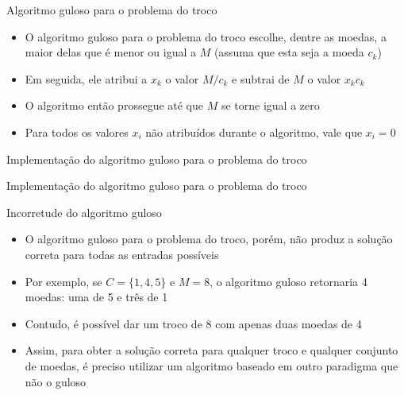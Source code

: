 \begin{frame}[fragile]{Algoritmo guloso para o problema do troco}

    \begin{itemize}
        \item O algoritmo guloso para o problema do troco escolhe, dentre as moedas, a maior delas
            que é menor ou igual a $M$ (assuma que esta seja a moeda $c_k$)

        \item Em seguida, ele atribui a $x_k$ o valor $M/c_k$ e subtrai de $M$ o valor $x_kc_k$

        \item O algoritmo então prossegue até que $M$ se torne igual a zero
            
        \item Para todos os valores $x_i$ não atribuídos durante o algoritmo, vale que $x_i = 0$ 

    \end{itemize}

\end{frame}



\begin{frame}[fragile]{Implementação do algoritmo guloso para o problema do troco}
\end{frame}

\begin{frame}[fragile]{Implementação do algoritmo guloso para o problema do troco}
\end{frame}

\begin{frame}[fragile]{Incorretude do algoritmo guloso}

    \begin{itemize}
        \item O algoritmo guloso para o problema do troco, porém, não produz a solução correta para
            todas as entradas possíveis

        \item Por exemplo, se $C = \{ 1, 4, 5 \}$ e $M = 8$, o algoritmo guloso retornaria 4
            moedas: uma de 5 e três de 1

        \item Contudo, é possível dar um troco de 8 com apenas duas moedas de 4

        \item Assim, para obter a solução correta para qualquer troco e qualquer conjunto de 
            moedas, é preciso utilizar um algoritmo baseado em outro paradigma que não o guloso
            
    \end{itemize}

\end{frame}

